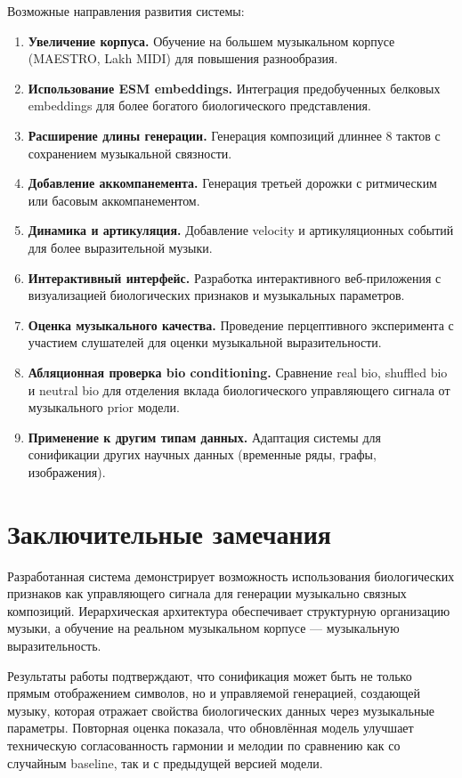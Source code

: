 Возможные направления развития системы:
\begin{enumerate}
\item \textbf{Увеличение корпуса.} Обучение на большем музыкальном корпусе (MAESTRO, Lakh MIDI) для повышения разнообразия.

\item \textbf{Использование ESM embeddings.} Интеграция предобученных белковых embeddings для более богатого биологического представления.

\item \textbf{Расширение длины генерации.} Генерация композиций длиннее 8 тактов с сохранением музыкальной связности.

\item \textbf{Добавление аккомпанемента.} Генерация третьей дорожки с ритмическим или басовым аккомпанементом.

\item \textbf{Динамика и артикуляция.} Добавление velocity и артикуляционных событий для более выразительной музыки.

\item \textbf{Интерактивный интерфейс.} Разработка интерактивного веб-приложения с визуализацией биологических признаков и музыкальных параметров.

\item \textbf{Оценка музыкального качества.} Проведение перцептивного эксперимента с участием слушателей для оценки музыкальной выразительности.

\item \textbf{Абляционная проверка bio conditioning.} Сравнение real bio, shuffled bio и neutral bio для отделения вклада биологического управляющего сигнала от музыкального prior модели.

\item \textbf{Применение к другим типам данных.} Адаптация системы для сонификации других научных данных (временные ряды, графы, изображения).
\end{enumerate}

\section*{Заключительные замечания}

Разработанная система демонстрирует возможность использования биологических признаков как управляющего сигнала для генерации музыкально связных композиций. Иерархическая архитектура обеспечивает структурную организацию музыки, а обучение на реальном музыкальном корпусе — музыкальную выразительность.

Результаты работы подтверждают, что сонификация может быть не только прямым отображением символов, но и управляемой генерацией, создающей музыку, которая отражает свойства биологических данных через музыкальные параметры. Повторная оценка показала, что обновлённая модель улучшает техническую согласованность гармонии и мелодии по сравнению как со случайным baseline, так и с предыдущей версией модели.
